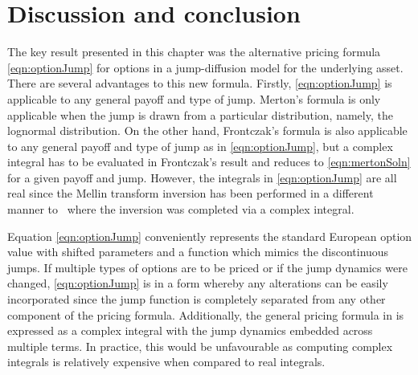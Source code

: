\section{Discussion and conclusion}
The key result presented in this chapter was the alternative pricing formula \eqref{eqn:optionJump} for options in a jump-diffusion model for the underlying asset. There are several advantages to this new formula. Firstly, \eqref{eqn:optionJump} is applicable to any general payoff and type of jump. Merton's formula is only applicable when the jump is drawn from a particular distribution, namely, the lognormal distribution. On the other hand, Frontczak's formula is also applicable to any general payoff and type of jump as in \eqref{eqn:optionJump}, but a complex integral has to be evaluated in Frontczak's result and reduces to \eqref{eqn:mertonSoln} for a given payoff and jump. However, the integrals in \eqref{eqn:optionJump} are all real since the Mellin transform inversion has been performed in a different manner to~\cite{Frontczak2013} where the inversion was completed via a complex integral.

Equation \eqref{eqn:optionJump} conveniently represents the standard European option value with shifted parameters and a function which mimics the discontinuous jumps. If multiple types of options are to be priced or if the jump dynamics were changed, \eqref{eqn:optionJump} is in a form whereby any alterations can be easily incorporated since the jump function is completely separated from any other component of the pricing formula. Additionally, the general pricing formula in \cite{Frontczak2013} is expressed as a complex integral with the jump dynamics embedded across multiple terms. In practice, this would be unfavourable as computing complex integrals is relatively expensive when compared to real integrals. %

